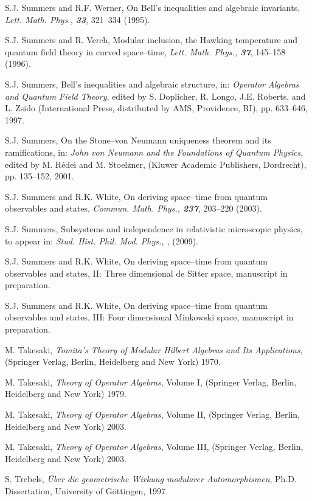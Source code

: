 \documentclass[12pt]{article}
\begin{document}
\begin{thebibliography}{Bor}
S.J. Summers and R.F. Werner, On Bell's inequalities and algebraic
invariants, {\sl Lett. Math. Phys., \bf 33}, 321--334 (1995).

S.J. Summers and R. Verch, Modular inclusion, the Hawking temperature
and quantum field theory in curved space--time, {\sl Lett. Math. Phys., \bf
37}, 145--158 (1996). 

S.J. Summers, Bell's inequalities and algebraic structure, in:
{\it Operator Algebras and Quantum Field Theory}, edited by S. Doplicher,
R. Longo, J.E. Roberts, and L. Zsido (International Press, distributed by
AMS, Providence, RI), pp. 633--646, 1997.

S.J. Summers, On the Stone--von Neumann uniqueness theorem and its
ramifications, in: {\it John von Neumann and the Foundations of 
Quantum Physics}, edited by M. R\'edei and M. Stoelzner, (Kluwer Academic 
Publishers, Dordrecht), pp. 135--152, 2001.

S.J. Summers and R.K. White, On deriving space--time from quantum
observables and states, {\sl Commun. Math. Phys., \bf 237}, 203--220 
(2003). 

S.J. Summers, Subsystems and independence in relativistic microscopic
physics, to appear in: {\sl Stud. Hist. Phil. Mod. Phys., \bf },
(2009).

S.J. Summers and R.K. White, On deriving space--time from quantum
observables and states, II: Three dimensional de Sitter space, 
manuscript in preparation. 

S.J. Summers and R.K. White, On deriving space--time from quantum
observables and states, III: Four dimensional Minkowski space, 
manuscript in preparation. 

M. Takesaki, {\it Tomita's Theory of Modular Hilbert Algebras and Its
Applications}, (Springer Verlag, Berlin, Heidelberg and New York) 1970.

M. Takesaki, {\it Theory of Operator Algebras}, Volume I,
(Springer Verlag, Berlin, Heidelberg and New York) 1979.

M. Takesaki, {\it Theory of Operator Algebras}, Volume II,
(Springer Verlag, Berlin, Heidelberg and New York) 2003.

M. Takesaki, {\it Theory of Operator Algebras}, Volume III,
(Springer Verlag, Berlin, Heidelberg and New York) 2003.

S. Trebels, {\it \"Uber die geometrische Wirkung modularer 
Automorphismen}, Ph.D. Dissertation, University of G\"ottingen, 1997.


\end{thebibliography}
\end{document}
